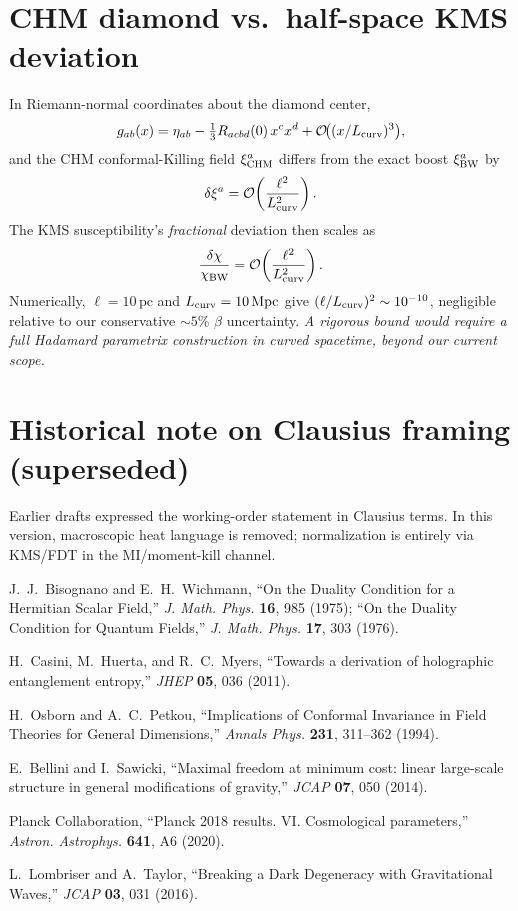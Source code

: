 \documentclass[aps,prd,onecolumn,superscriptaddress,nofootinbib]{revtex4-2}
\begin{document}
\section{CHM diamond vs.\ half-space KMS deviation}
\label{app:chm-kms-estimate}
In Riemann-normal coordinates about the diamond center,
\[
g_{ab}(x)=\eta_{ab}-\tfrac{1}{3}R_{acbd}(0)\,x^c x^d+\mathcal O\!\big((x/L_{\rm curv})^3\big),
\]
and the CHM conformal-Killing field \(\xi^a_{\rm CHM}\) differs from the exact boost \(\xi^a_{\rm BW}\) by
\[
\delta\xi^a=\mathcal O\!\left(\frac{\ell^2}{L_{\rm curv}^2}\right).
\]
The KMS susceptibility’s \emph{fractional} deviation then scales as
\[
\frac{\delta\chi}{\chi_{\rm BW}}=\mathcal O\!\left(\frac{\ell^2}{L_{\rm curv}^2}\right).
\]
Numerically, \(\ell=10\,\mathrm{pc}\) and \(L_{\rm curv}=10\,\mathrm{Mpc}\) give \((\ell/L_{\rm curv})^2\sim 10^{-10}\), negligible relative to our conservative \(\sim 5\%\) \(\beta\) uncertainty. \emph{A rigorous bound would require a full Hadamard parametrix construction in curved spacetime, beyond our current scope.}

\section{Historical note on Clausius framing (superseded)}
\label{app:clausius-historical}
Earlier drafts expressed the working-order statement in Clausius terms. In this version, macroscopic heat language is removed; normalization is entirely via KMS/FDT in the MI/moment-kill channel.


\begin{thebibliography}{99}

J.~J.~Bisognano and E.~H.~Wichmann,
``On the Duality Condition for a Hermitian Scalar Field,''
\emph{J. Math. Phys.} \textbf{16}, 985 (1975);
``On the Duality Condition for Quantum Fields,''
\emph{J. Math. Phys.} \textbf{17}, 303 (1976).

H.~Casini, M.~Huerta, and R.~C.~Myers,
``Towards a derivation of holographic entanglement entropy,''
\emph{JHEP} \textbf{05}, 036 (2011).

H.~Osborn and A.~C.~Petkou,
``Implications of Conformal Invariance in Field Theories for General Dimensions,''
\emph{Annals Phys.} \textbf{231}, 311--362 (1994).

E.~Bellini and I.~Sawicki,
``Maximal freedom at minimum cost: linear large-scale structure in general modifications of gravity,''
\emph{JCAP} \textbf{07}, 050 (2014).

Planck Collaboration,
``Planck 2018 results. VI. Cosmological parameters,''
\emph{Astron. Astrophys.} \textbf{641}, A6 (2020).

L.~Lombriser and A.~Taylor,
``Breaking a Dark Degeneracy with Gravitational Waves,''
\emph{JCAP} \textbf{03}, 031 (2016).

\end{thebibliography}
\end{document}
